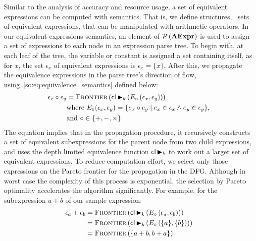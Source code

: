 Similar to the analysis of accuracy and resource usage, a set of equivalent
expressions can be computed with semantics. That is, we define structures,
\ie~sets of equivalent expressions, that can be manipulated with arithmetic
operators. In our equivalent expressions semantics, an element of
$\mathcal{P}\left({\mathbf{AExpr}}\right)$ is used to assign a set of expressions to each node
in an expression parse tree. To begin with, at each leaf of the tree, the
variable or constant is assigned a set containing itself, as for $x$, the set
$\epsilon_x$ of equivalent expressions is $\epsilon_x = \{x\}$. After this, we
propagate the equivalence expressions in the parse tree's direction of flow,
using~\eqref{so:eq:equivalence_semantics} defined below:
\begin{equation}
    \begin{aligned}
        \epsilon_x \circ \epsilon_y &= \operatorname{\textsc{Frontier}}\left(
            \mathsf{cl} \operatorname{\blacktriangleright}_k \left(
                E_\circ \left( \epsilon_x, \epsilon_y \right)
            \right) \right) \\
        & \text{where~}
        E_\circ(\epsilon_x, \epsilon_y) = \{
            e_x \circ e_y \mid e_x \in \epsilon_x \wedge e_y \in \epsilon_y
        \}, \\
        & \text{and~} \circ\in\{+, -, \times\}
    \end{aligned}
    \label{so:eq:equivalence_semantics}
\end{equation}
The equation implies that in the propagation procedure, it recursively
constructs a set of equivalent subexpressions for the parent node from two
child expressions, and uses the depth limited equivalence function $\mathsf{cl}
\operatorname{\blacktriangleright}_k$ to work out a larger set of equivalent expressions. To reduce
computation effort, we select only those expressions on the Pareto frontier
for the propagation in the DFG\@. Although in worst case the complexity of
this process is exponential, the selection by Pareto optimality accelerates
the algorithm significantly. For example, for the subexpression $a + b$ of our
sample expression:
\begin{equation}
    \begin{aligned}
        \epsilon_a + \epsilon_b
            &= \operatorname{\textsc{Frontier}}\left(
                    \mathsf{cl} \operatorname{\blacktriangleright}_k \left(
                        E_\circ \left( \epsilon_a, \epsilon_b \right)
                    \right)
                \right) \\
            &= \operatorname{\textsc{Frontier}}\left(
                    \mathsf{cl} \operatorname{\blacktriangleright}_k \left(
                        E_\circ \left( \{a\}, \{b\} \right)
                    \right)
                \right) \\
            &= \operatorname{\textsc{Frontier}}\left(
                    \{ a + b, b + a \}
                \right)
    \end{aligned}
\end{equation}
